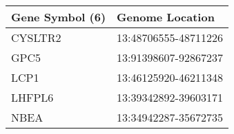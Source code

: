 \begin{tabular}{ll}
\toprule
Gene Symbol (6) &      Genome Location \\
\midrule
        CYSLTR2 & 13:48706555-48711226 \\
           GPC5 & 13:91398607-92867237 \\
           LCP1 & 13:46125920-46211348 \\
         LHFPL6 & 13:39342892-39603171 \\
           NBEA & 13:34942287-35672735 \\
\bottomrule
\end{tabular}
